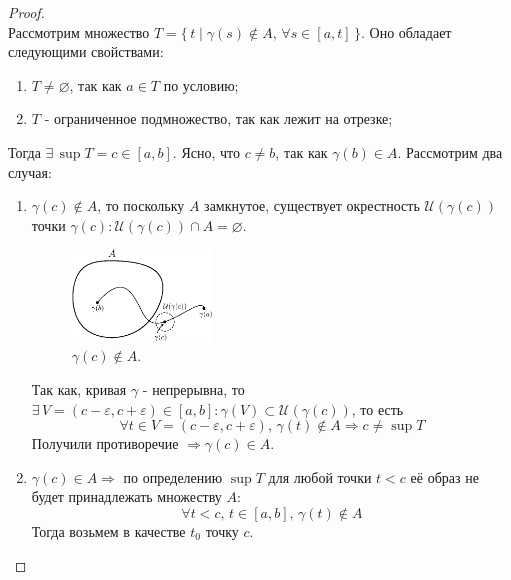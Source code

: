 \documentclass[12pt]{article}
\newcommand{\MU}{\mathcal{U}}
\newcommand{\VN}{\varnothing}
\newcommand{\VE}{\varepsilon}
\theoremstyle{definition}
\begin{document}
\begin{proof}\hfill\\
	Рассмотрим множество $T = \{\,t \mid \gamma(s) \notin A, \, \forall s \in [a,t] \,\}$. Оно обладает следующими свойствами:
	\begin{enumerate}[label ={\arabic*)}]
		\item $T \neq \VN$, так как $a \in T$ по условию;
		\item $T$ - ограниченное подмножество, так как лежит на отрезке;
	\end{enumerate}  
	Тогда $\exists \, \sup{T} = c \in [a,b]$. Ясно, что $c \neq b$, так как $\gamma(b) \in A$. Рассмотрим два случая:
	\begin{enumerate}[label ={(\arabic*)}]
		\item $\gamma(c) \notin A$, то поскольку $A$ замкнутое, существует окрестность $\MU(\gamma(c))$ точки $\gamma(c)\colon \MU(\gamma(c)) \cap A = \VN$.
		\begin{figure}[H]
			\centering
			\includegraphics[width=0.35\textwidth]{1_16.eps}
			\caption{$\gamma(c) \notin A$.}
			\label{1_16}
		\end{figure}
		Так как, кривая $\gamma$ - непрерывна, то $\exists \, V = (c - \VE, c + \VE) \in [a,b] \colon \gamma(V) \subset \MU(\gamma(c))$, то есть 
		$$\forall t \in V = (c - \VE, c + \VE),\, \gamma(t) \notin A \Rightarrow c \neq \sup{T}$$
		Получили противоречие $\Rightarrow \gamma(c) \in A$.
		\item $\gamma(c) \in A \Rightarrow$ по определению $\sup{T}$ для любой точки $t < c$ её образ не будет принадлежать множеству $A$:
		$$\forall t < c,\,  t \in [a,b], \, \gamma(t) \notin A$$
		Тогда возьмем в качестве $t_0$ точку $c$. 
	\end{enumerate}
\end{proof}
\end{document}
